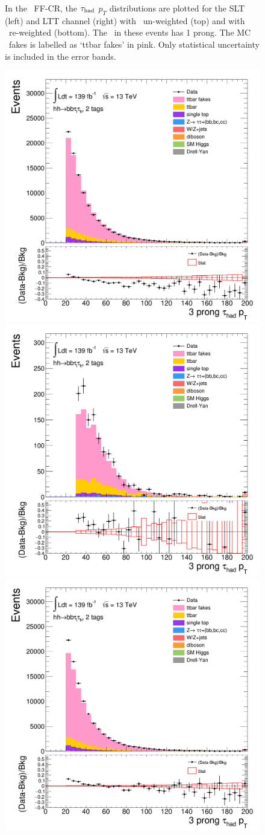 \begin{figure}[htbp]
\caption{In the \ttbar\ FF-CR, the $\tau_{\mathrm{had}}$ $p_T$ distributions are plotted 
for the SLT (left) and LTT channel (right) 
with \ttbar\ un-weighted (top) 
and with \ttbar\ re-weighted (bottom).
The \tauhad\ in these events has 1 prong. 
The MC \ttbar\ fakes is labelled as `ttbar fakes' in pink.
Only statistical uncertainty is included in the error bands.}
\label{fig:ttbarCR_1}
\end{figure} 
\begin{figure}[htbp]
\centering
\includegraphics[width=.45\textwidth]{DiHiggs/plots/FF_CRs/ttbarCR_SLT/HNone/BDTVarsHighMbb/2/C_2tag2pjet_0ptv_TauPt3P.png}
\includegraphics[width=.45\textwidth]{DiHiggs/plots/FF_CRs/ttbarCR_LTT/HNone/BDTVarsHighMbb/2/C_2tag2pjet_0ptv_TauPt3P.png}\\
\includegraphics[width=.45\textwidth]{DiHiggs/plots/FF_CRs/ttbarCR_SLT_weighted/HNone/BDTVarsHighMbb/2/C_2tag2pjet_0ptv_TauPt3P.png}

\end{figure}
